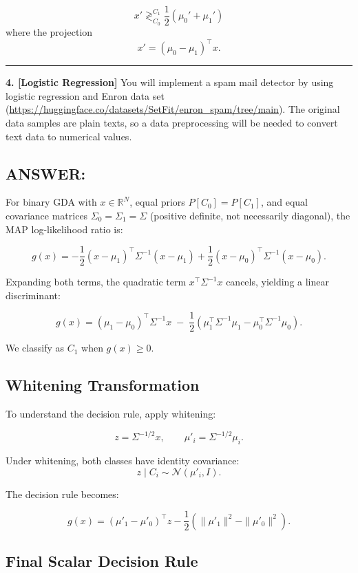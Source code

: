 \documentclass[12pt]{article}
\begin{document}
\[
x' \mathop{\gtrless}_{C_0}^{C_1} \frac{1}{2} (\mu_0' + \mu_1')
\]
where the projection
\[
x' = (\mu_0 - \mu_1)^\top x.
\]

\vspace{1em}
\hrule
\vspace{1em}

\newpage\textbf{4. [Logistic Regression]} You will implement a spam mail detector by using logistic regression and Enron data set (\url{https://huggingface.co/datasets/SetFit/enron_spam/tree/main}). The original data samples are plain texts, so a data preprocessing will be needed to convert text data to numerical values.

\subsection*{ANSWER:}
For binary GDA with $x \in \mathbb{R}^N$, equal priors $P[C_0] = P[C_1]$, and equal covariance
matrices $\Sigma_0 = \Sigma_1 = \Sigma$ (positive definite, not necessarily diagonal), the MAP
log-likelihood ratio is:

\[
g(x) = 
-\frac{1}{2}(x-\mu_1)^\top \Sigma^{-1}(x-\mu_1)
+\frac{1}{2}(x-\mu_0)^\top \Sigma^{-1}(x-\mu_0).
\]

Expanding both terms, the quadratic term $x^\top \Sigma^{-1} x$ cancels, yielding a linear
discriminant:

\[
g(x) = (\mu_1 - \mu_0)^\top \Sigma^{-1} x 
\;-\; \frac{1}{2}\left(
\mu_1^\top \Sigma^{-1} \mu_1
-
\mu_0^\top \Sigma^{-1} \mu_0
\right).
\]

We classify as $C_1$ when $g(x) \ge 0$.

\subsection*{Whitening Transformation}

To understand the decision rule, apply whitening:

\[
z = \Sigma^{-1/2} x, \qquad
\mu'_i = \Sigma^{-1/2} \mu_i.
\]

Under whitening, both classes have identity covariance:
\[
z \mid C_i \sim \mathcal{N}(\mu'_i, I).
\]

The decision rule becomes:

\[
g(x)
=
(\mu'_1 - \mu'_0)^\top z
-
\frac{1}{2}
\left(
\|\mu'_1\|^2 - \|\mu'_0\|^2
\right).
\]

\subsection*{Final Scalar Decision Rule}
\end{document}
